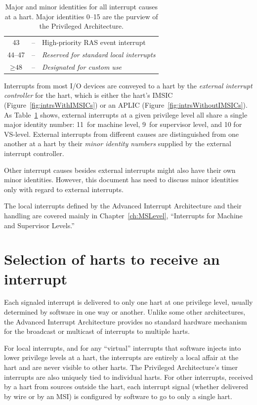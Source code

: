 \begin{table}[h!]
\begin{center}
\begin{tabular}{|c|c|l|}
43             & --       & High-priority RAS event interrupt \\
44--47         & --       & \em Reserved for standard local interrupts \\
\hline
$\geq \mbox{48}$ & --     & \em Designated for custom use \\
\hline
\end{tabular}
\end{center}
\caption{%
Major and minor identities for all interrupt causes at a hart.
Major identities 0--15 are the purview of the {\RISCV} Privileged
Architecture.%
}
\label{tab:interruptIdents}
\end{table}

Interrupts from most I/O devices are conveyed to a hart by the
\emph{external interrupt controller} for the hart, which is either the
hart's IMSIC (Figure~\ref{fig:intrsWithIMSICs}) or an APLIC
(Figure~\ref{fig:intrsWithoutIMSICs}).
As Table~\ref{tab:interruptIdents} shows, external interrupts
at a given privilege level all share a single major identity
number:  11~for machine level, 9~for supervisor level, and 10 for
\mbox{VS-level}.
External interrupts from different causes are distinguished from one
another at a hart by their \emph{minor identity numbers} supplied by
the external interrupt controller.

Other interrupt causes besides external interrupts might also have
their own minor identities.
However, this document has need to discuss minor identities only with
regard to external interrupts.

The local interrupts defined by the Advanced Interrupt Architecture
and their handling are covered mainly in Chapter~\ref{ch:MSLevel},
``Interrupts for Machine and Supervisor Levels.''

\section{Selection of harts to receive an interrupt}

Each signaled interrupt is delivered to only one hart at one privilege
level, usually determined by software in one way or another.
Unlike some other architectures, the {\RISCV} Advanced Interrupt
Architecture provides no standard hardware mechanism for the broadcast
or multicast of interrupts to multiple harts.

For local interrupts, and for any ``virtual'' interrupts that software
injects into lower privilege levels at a hart, the interrupts are
entirely a local affair at the hart and are never visible to other
harts.
The {\RISCV} Privileged Architecture's timer interrupts are also
uniquely tied to individual harts.
For other interrupts, received by a hart from sources outside the
hart, each interrupt signal (whether delivered by wire or by an MSI) is
configured by software to go to only a single hart.

